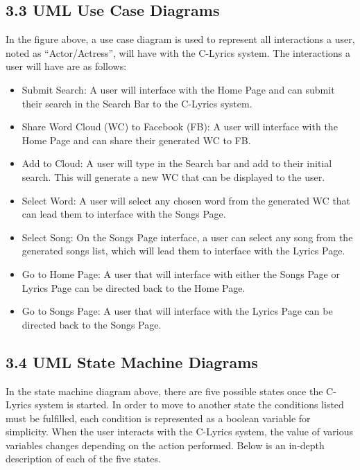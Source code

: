 \documentclass[]{article}
\begin{document}
\subsection{3.3 UML Use Case Diagrams}\label{uml-use-case-diagrams}

In the figure above, a use case diagram is used to represent all
interactions a user, noted as ``Actor/Actress'', will have with the
C-Lyrics system. The interactions a user will have are as follows:

\begin{itemize}
\itemsep1pt\parskip0pt
\item
  Submit Search: A user will interface with the Home Page and can submit
  their search in the Search Bar to the C-Lyrics system.
\item
  Share Word Cloud (WC) to Facebook (FB): A user will interface with the
  Home Page and can share their generated WC to FB.
\item
  Add to Cloud: A user will type in the Search bar and add to their
  initial search. This will generate a new WC that can be displayed to
  the user.
\item
  Select Word: A user will select any chosen word from the generated WC
  that can lead them to interface with the Songs Page.
\item
  Select Song: On the Songs Page interface, a user can select any song
  from the generated songs list, which will lead them to interface with
  the Lyrics Page.
\item
  Go to Home Page: A user that will interface with either the Songs Page
  or Lyrics Page can be directed back to the Home Page.
\item
  Go to Songs Page: A user that will interface with the Lyrics Page can
  be directed back to the Songs Page.
\end{itemize}

\subsection{3.4 UML State Machine
Diagrams}\label{uml-state-machine-diagrams}

In the state machine diagram above, there are five possible states once
the C-Lyrics system is started. In order to move to another state the
conditions listed must be fulfilled, each condition is represented as a
boolean variable for simplicity. When the user interacts with the
C-Lyrics system, the value of various variables changes depending on the
action performed. Below is an in-depth description of each of the five
states.
\end{document}

